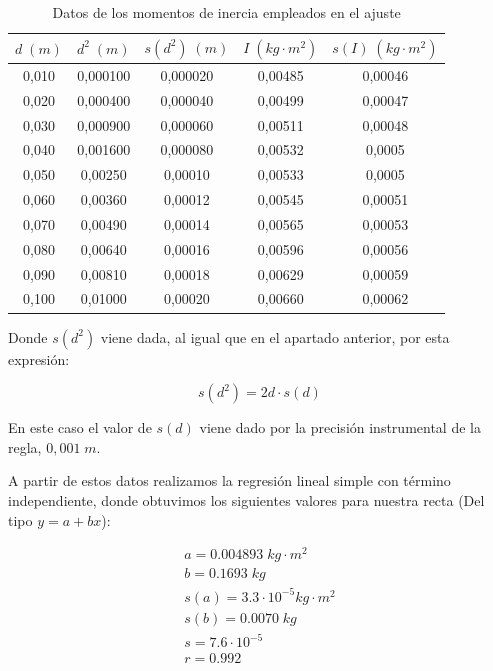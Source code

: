 \documentclass[a4paper,12pt,titlepage]{article}
\begin{document}
\begin{table}[h!]
    \centering
    \begin{tabular}{|c|c|c|c|c|}
    \hline
    $d \; (m)$ & $d^2\; (m)$ & $s(d^2) \; (m)$ & $I\;(kg\cdot m^2)$& $s(I)\;(kg\cdot m^2)$ \\ \hline
    0,010 & 0,000100 & 0,000020 & 0,00485 & 0,00046 \\ \hline
    0,020 & 0,000400 & 0,000040 & 0,00499 & 0,00047 \\ \hline
    0,030 & 0,000900 & 0,000060 & 0,00511 & 0,00048 \\ \hline
    0,040 & 0,001600 & 0,000080 & 0,00532 & 0,0005  \\ \hline
    0,050 & 0,00250 & 0,00010  & 0,00533 & 0,0005  \\ \hline
    0,060 & 0,00360 & 0,00012 & 0,00545 & 0,00051 \\ \hline
    0,070 & 0,00490 & 0,00014 & 0,00565 & 0,00053 \\ \hline
    0,080 & 0,00640 & 0,00016 & 0,00596 & 0,00056 \\ \hline
    0,090 & 0,00810 & 0,00018 & 0,00629 & 0,00059 \\ \hline
    0,100  & 0,01000 & 0,00020  & 0,00660  & 0,00062 \\ \hline
    \end{tabular}
    \caption{Datos de los momentos de inercia empleados en el ajuste}
    \label{Datos steiner 2}
\end{table}


Donde $s(d^2)$ viene dada, al igual que en el apartado anterior, por esta expresión:

\begin{equation}
    s(d^2) = 2d \cdot s(d)
\end{equation}

En este caso el valor de $s(d)$ viene dado por la precisión instrumental de la regla, $0,001 \;m$.

\par A partir de estos datos realizamos la regresión lineal simple con término independiente, donde obtuvimos los siguientes valores para nuestra recta (Del tipo $y=a+bx$):

\begin{equation}
    \begin{gathered}
        a = 0.004893 \; kg \cdot m^2 \\
        b = 0.1693 \; kg \\
        s(a) = 3.3\cdot 10^{-5} kg \cdot m^2 \\
        s(b) = 0.0070 \; kg \\
        s = 7.6 \cdot 10^{-5} \\
        r = 0.992
    \end{gathered}
\end{equation}
\end{document}
